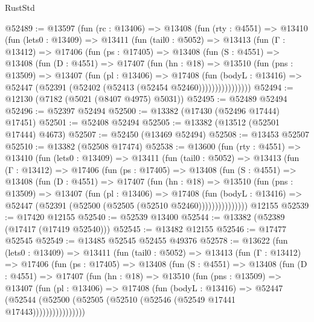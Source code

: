 \begin{lexlean}{RustStd}
\begin{coremodule}
@52489 := @13597
    (fun (rc : @13406) =>
    @13408
      (fun (rty : @4551) =>
      @13410
        (fun (lets0 : @13409) =>
        @13411
          (fun (tail0 : @5052) =>
          @13413
            (fun (Γ : @13412) =>
            @17406
              (fun (ps : @17405) =>
              @13408
                (fun (S : @4551) =>
                @13408
                  (fun (D : @4551) =>
                  @17407
                    (fun (hn : @18) =>
                    @13510
                      (fun (pns : @13509) =>
                      @13407
                        (fun (pl : @13406) =>
                        @17408
                          (fun (bodyL : @13416) =>
                          @52447 (@52391 (@52402 (@52413 (@52454 @52460))))))))))))))))
@52494 := @12130 (@7182 (@5021 (@8407 @4975) @5031))
@52495 := @52489 @52494
@52496 := @52397 @52494
@52500 := @13382 (@17430 (@52496 @17444) @17451)
@52501 := @52408 @52494
@52505 := @13382 (@13512 (@52501 @17444) @4673)
@52507 := @52450 (@13469 @52494)
@52508 := @13453 @52507
@52510 := @13382 (@52508 @17474)
@52538 := @13600
    (fun (rty : @4551) =>
    @13410
      (fun (lets0 : @13409) =>
      @13411
        (fun (tail0 : @5052) =>
        @13413
          (fun (Γ : @13412) =>
          @17406
            (fun (ps : @17405) =>
            @13408
              (fun (S : @4551) =>
              @13408
                (fun (D : @4551) =>
                @17407
                  (fun (hn : @18) =>
                  @13510
                    (fun (pns : @13509) =>
                    @13407
                      (fun (pl : @13406) =>
                      @17408
                        (fun (bodyL : @13416) =>
                        @52447 (@52391 (@52500 (@52505 (@52510 @52460)))))))))))))))
    @12155
@52539 := @17420 @12155
@52540 := @52539 @13400
@52544 := @13382 (@52389 (@17417 (@17419 @52540)))
@52545 := @13482 @12155
@52546 := @17477 @52545
@52549 := @13485 @52545 @52455 @49376
@52578 := @13622
    (fun (lets0 : @13409) =>
    @13411
      (fun (tail0 : @5052) =>
      @13413
        (fun (Γ : @13412) =>
        @17406
          (fun (ps : @17405) =>
          @13408
            (fun (S : @4551) =>
            @13408
              (fun (D : @4551) =>
              @17407
                (fun (hn : @18) =>
                @13510
                  (fun (pns : @13509) =>
                  @13407
                    (fun (pl : @13406) =>
                    @17408
                      (fun (bodyL : @13416) =>
                      @52447
                        (@52544
                          (@52500 (@52505 (@52510 (@52546 (@52549 @17441 @17443))))))))))))))))

\end{coremodule}
\end{lexlean}

